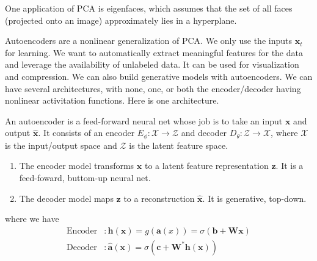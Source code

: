 \documentclass{article}
\begin{document}
  One application of PCA is eigenfaces, which assumes that the set of all faces (projected onto an image) approximately lies in a hyperplane. 

  Autoencoders are a nonlinear generalization of PCA. We only use the inputs $\mathbf{x}_t$ for learning. We want to automatically extract meaningful features for the data and leverage the availability of unlabeled data. It can be used for visualization and compression. We can also build generative models with autoencoders. We can have several architectures, with none, one, or both the encoder/decoder having nonlinear activitation functions. Here is one architecture. 

  \begin{definition}[Autoencoder]
    An autoencoder is a feed-forward neural net whose job is to take an input $\mathbf{x}$ and output $\hat{\mathbf{x}}$. It consists of an encoder $E_\phi: \mathcal{X} \rightarrow \mathcal{Z}$ and decoder $D_\theta: \mathcal{Z} \rightarrow \mathcal{X}$, where $\mathcal{X}$ is the input/output space and $\mathcal{Z}$ is the latent feature space. 

    \begin{enumerate}
      \item The encoder model transforms $\mathbf{x}$ to a latent feature representation $\mathbf{z}$. It is a feed-foward, buttom-up neural net. 
      \item The decoder model maps $\mathbf{z}$ to a reconstruction $\hat{\mathbf{x}}$. It is generative, top-down. 
    \end{enumerate}
    where we have 
    \begin{align*} 
        \mathrm{Encoder} & : \mathbf{h}(\mathbf{x}) = g(\mathbf{a}(x)) = \sigma (\mathbf{b} + \mathbf{W} \mathbf{x}) \\
        \mathrm{Decoder} & : \hat{\mathbf{a}}(\mathbf{x}) = \sigma (\mathbf{c} + \mathbf{W}^\ast \mathbf{h}(\mathbf{x})) 
    \end{align*} 
    \begin{figure}[H]
      \centering 
\end{figure}
\end{definition}
\end{document}
